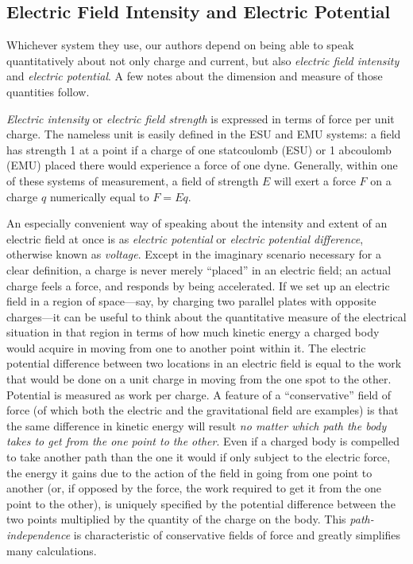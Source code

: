 \subsection*{Electric Field Intensity and Electric Potential}

Whichever system they use, our authors depend on being able to speak
quantitatively about not only charge and current, but also \emph{electric field
intensity} and \emph{electric potential}. A few notes about the dimension
and measure of those quantities follow.

\emph{Electric intensity} or \emph{electric field strength} is expressed
in terms of force per unit charge. The nameless unit is easily defined in the
ESU and EMU systems: a field has strength 1 at a point if a charge of one
statcoulomb (ESU) or 1 abcoulomb (EMU) placed there would experience a force 
of one dyne. Generally, within one of these systems of measurement, a field of 
strength $E$ will exert a force $F$ on a charge $q$ numerically equal to $F = Eq$.

An especially convenient way of speaking about the intensity and extent of
an electric field at once is as \emph{electric potential} or \emph{electric 
potential difference}, otherwise known as \emph{voltage}. Except in the imaginary scenario
necessary for a clear definition, a charge is never merely ``placed'' in an electric
field; an actual charge feels a force, and responds by being accelerated. If we set up an
electric field in a region of space---say, by charging two parallel plates
with opposite charges---it can be useful to think about the quantitative
measure of the electrical situation in that region in terms of how much kinetic energy a 
charged body would acquire in moving from one to another point within it. The electric potential
difference between two locations in an electric field is equal to the work that
would be done on a unit charge in moving from the one spot to the other. Potential
is measured as work per charge. A feature of a ``conservative'' field of force 
(of which both the electric and the gravitational field are examples) is that
the same difference in kinetic energy will result \emph{no matter which path the
body takes to get from the one point to the other}. Even if a charged body is compelled
to take another path than the one it would if only subject to the electric force, the energy 
it gains due to the action of the field in going from one point to another (or, if opposed
by the force, the work required to get it from the one point to the other),
is uniquely specified by the potential difference between the two points multiplied by the 
quantity of the charge on the body.
This \emph{path-independence} is characteristic of conservative fields of force and
greatly simplifies many calculations.

